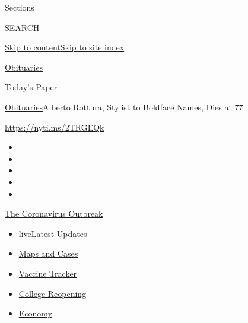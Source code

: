 Sections

SEARCH

\protect\hyperlink{site-content}{Skip to
content}\protect\hyperlink{site-index}{Skip to site index}

\href{https://www.nytimes3xbfgragh.onion/section/obituaries}{Obituaries}

\href{https://myaccount.nytimes3xbfgragh.onion/auth/login?response_type=cookie\&client_id=vi}{}

\href{https://www.nytimes3xbfgragh.onion/section/todayspaper}{Today's
Paper}

\href{/section/obituaries}{Obituaries}\textbar{}Alberto Rottura, Stylist
to Boldface Names, Dies at 77

\url{https://nyti.ms/2TRGEQk}

\begin{itemize}
\item
\item
\item
\item
\item
\end{itemize}

\href{https://www.nytimes3xbfgragh.onion/news-event/coronavirus?action=click\&pgtype=Article\&state=default\&region=TOP_BANNER\&context=storylines_menu}{The
Coronavirus Outbreak}

\begin{itemize}
\tightlist
\item
  live\href{https://www.nytimes3xbfgragh.onion/2020/08/04/world/coronavirus-covid-19.html?action=click\&pgtype=Article\&state=default\&region=TOP_BANNER\&context=storylines_menu}{Latest
  Updates}
\item
  \href{https://www.nytimes3xbfgragh.onion/interactive/2020/us/coronavirus-us-cases.html?action=click\&pgtype=Article\&state=default\&region=TOP_BANNER\&context=storylines_menu}{Maps
  and Cases}
\item
  \href{https://www.nytimes3xbfgragh.onion/interactive/2020/science/coronavirus-vaccine-tracker.html?action=click\&pgtype=Article\&state=default\&region=TOP_BANNER\&context=storylines_menu}{Vaccine
  Tracker}
\item
  \href{https://www.nytimes3xbfgragh.onion/2020/08/02/us/covid-college-reopening.html?action=click\&pgtype=Article\&state=default\&region=TOP_BANNER\&context=storylines_menu}{College
  Reopening}
\item
  \href{https://www.nytimes3xbfgragh.onion/live/2020/08/03/business/stock-market-today-coronavirus?action=click\&pgtype=Article\&state=default\&region=TOP_BANNER\&context=storylines_menu}{Economy}
\end{itemize}

